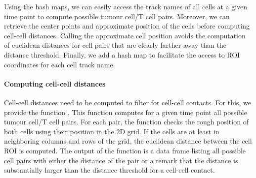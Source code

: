 \documentclass{report}
\begin{document}
Using the hash maps, we can easily access the track names of all cells at a given time point to compute possible tumour cell/T cell pairs. Moreover, we can retrieve the center points and approximate position of the cells before computing cell-cell distances. Calling the approximate cell position avoids the computation of euclidean distances for cell pairs that are clearly farther away than the distance threshold. Finally, we add a hash map to facilitate the access to ROI coordinates for each cell track name. 

%
%	
%	
%	

\paragraph{Computing cell-cell distances}
Cell-cell distances need to be computed to filter for cell-cell contacts. For this, we provide the function . This function computes for a given time point all possible tumour cell/T cell pairs. For each pair, the function checks the rough position of both cells using their position in the 2D grid. If the cells are at least in neighboring columns and rows of the grid, the euclidean distance between the cell ROI is computed.
The output of the function is a data frame listing all possible cell pairs with either the distance of the pair or a remark that the distance is substantially larger than the distance threshold for a cell-cell contact.
\end{document}
